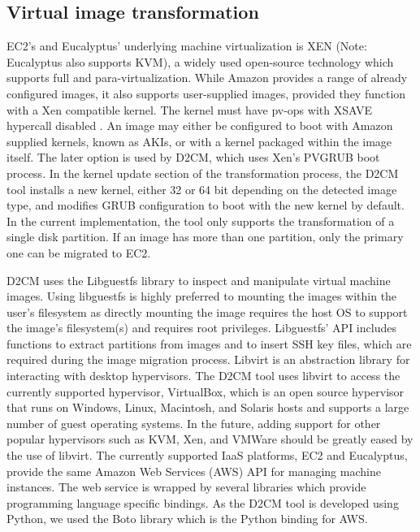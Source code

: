 \documentclass[a4paper,10pt]{article}
\begin{document}
\subsection{Virtual image transformation}
\label{vmtransform}
EC2's and Eucalyptus' underlying machine virtualization is XEN (Note: Eucalyptus also supports KVM), a widely used open-source technology which supports full and para-virtualization. While Amazon provides a range of already configured images, it also supports user-supplied images, provided they function with a Xen compatible kernel. The kernel must have pv-ops with XSAVE hypercall disabled \cite{amazonkernels}. An image may either be configured to boot with Amazon supplied kernels, known as AKIs, or with a kernel packaged within the image itself. The later option is used by D2CM, which uses Xen's PVGRUB boot process. In the kernel update section of the transformation process, the D2CM tool installs a new kernel, either 32 or 64 bit depending on the detected image type, and modifies GRUB configuration to boot with the new kernel by default. In the current implementation, the tool only supports the transformation of a single disk partition. If an image has more than one partition, only the primary one can be migrated to EC2.

D2CM uses the Libguestfs library \cite{libguestfs} to inspect and manipulate virtual machine images. Using libguestfs is highly preferred to mounting the images within the user's filesystem as directly mounting the image requires the host OS to support the image's filesystem(s) and requires root privileges. Libguestfs' API includes functions to extract partitions from images and to insert SSH key files, which are required during the image migration process. Libvirt \cite{libvirt} is an abstraction library for interacting with desktop hypervisors. The D2CM tool uses libvirt to access the currently supported hypervisor, VirtualBox, which is an open source hypervisor that runs on Windows, Linux, Macintosh, and Solaris hosts and supports a large number of guest operating systems.   In the future, adding support for other popular hypervisors such as KVM, Xen, and VMWare should be greatly eased by the use of libvirt. The currently supported IaaS platforms, EC2 and Eucalyptus, provide the same Amazon Web Services (AWS) API for managing machine instances. The web service is wrapped by several libraries which provide programming language specific bindings. As the D2CM tool is developed using Python, we used the Boto library which is the Python binding for AWS.
\end{document}
